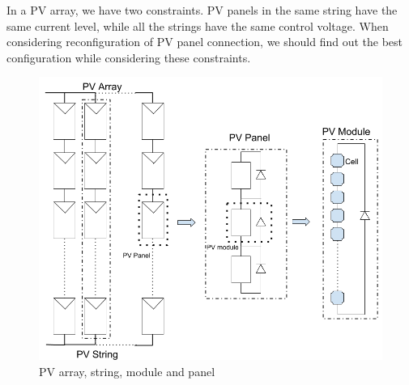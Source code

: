 \documentclass[conference]{IEEEtran}
\begin{document}
In a PV array, we have two constraints. PV panels in the same string have the same current level, while all the strings have the same control voltage. When considering reconfiguration of PV panel connection, we should find out the best configuration while considering these constraints. 

\begin{figure}[t]
    \centering
    \includegraphics[width=0.8\linewidth]{module.png}
    \caption{PV array, string, module and panel}
    \label{model}
\end{figure}
\end{document}
